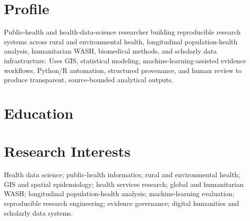 \documentclass[10.5pt,letterpaper]{article}
\begin{document}

\section*{Profile}
Public-health and health-data-science researcher building reproducible research systems across rural and environmental health, longitudinal population-health analysis, humanitarian WASH, biomedical methods, and scholarly data infrastructure. Uses GIS, statistical modeling, machine-learning-assisted evidence workflows, Python/R automation, structured provenance, and human review to produce transparent, source-bounded analytical outputs.

\section*{Education}

\section*{Research Interests}
Health data science; public-health informatics; rural and environmental health; GIS and spatial epidemiology; health services research; global and humanitarian WASH; longitudinal population-health analysis; machine-learning evaluation; reproducible research engineering; evidence governance; digital humanities and scholarly data systems.



\end{document}
